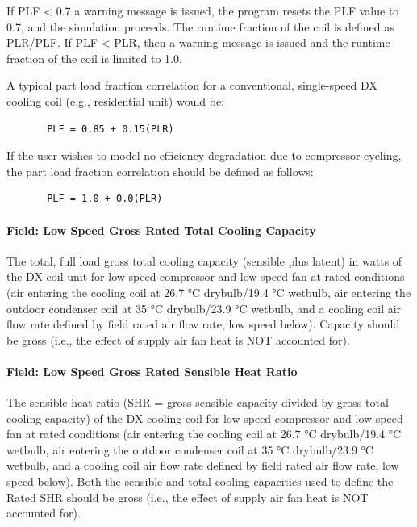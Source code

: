 If PLF \textless{} 0.7 a warning message is issued, the program resets the PLF value to 0.7, and the simulation proceeds. The runtime fraction of the coil is defined as PLR/PLF. If PLF \textless{} PLR, then a warning message is issued and the runtime fraction of the coil is limited to 1.0.

A typical part load fraction correlation for a conventional, single-speed DX cooling coil (e.g., residential unit) would be:

\begin{lstlisting}
       PLF = 0.85 + 0.15(PLR)
\end{lstlisting}

If the user wishes to model no efficiency degradation due to compressor cycling, the part load fraction correlation should be defined as follows:

\begin{lstlisting}
       PLF = 1.0 + 0.0(PLR)
\end{lstlisting}

\paragraph{Field: Low Speed Gross Rated Total Cooling Capacity}\label{field-low-speed-gross-rated-total-cooling-capacity}

The total, full load gross total cooling capacity (sensible plus latent) in watts of the DX coil unit for low speed compressor and low speed fan at rated conditions (air entering the cooling coil at 26.7 °C drybulb/19.4 °C wetbulb, air entering the outdoor condenser coil at 35 °C drybulb/23.9 °C wetbulb, and a cooling coil air flow rate defined by field rated air flow rate, low speed below). Capacity should be gross (i.e., the effect of supply air fan heat is NOT accounted for).

\paragraph{Field: Low Speed Gross Rated Sensible Heat Ratio}\label{field-low-speed-gross-rated-sensible-heat-ratio}

The sensible heat ratio (SHR = gross sensible capacity divided by gross total cooling capacity) of the DX cooling coil for low speed compressor and low speed fan at rated conditions (air entering the cooling coil at 26.7 °C drybulb/19.4 °C wetbulb, air entering the outdoor condenser coil at 35 °C drybulb/23.9 °C wetbulb, and a cooling coil air flow rate defined by field rated air flow rate, low speed below). Both the sensible and total cooling capacities used to define the Rated SHR should be gross (i.e., the effect of supply air fan heat is NOT accounted for).

